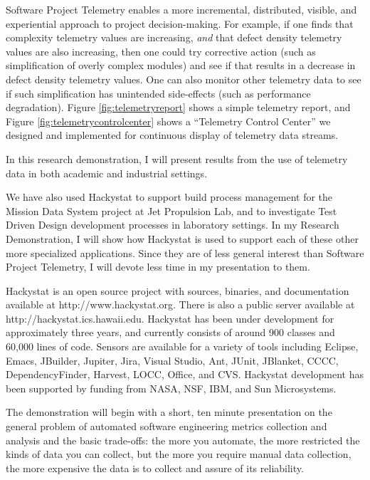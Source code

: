 \documentclass[11pt,twocolumn]{article}
\begin{document}
Software Project Telemetry enables a more incremental, distributed,
visible, and experiential approach to project decision-making. For example,
if one finds that complexity telemetry values are increasing, {\em and}
that defect density telemetry values are also increasing, then one could
try corrective action (such as simplification of overly complex modules)
and see if that results in a decrease in defect density telemetry
values. One can also monitor other telemetry data to see if such
simplification has unintended side-effects (such as performance
degradation).  Figure \ref{fig:telemetryreport} shows a simple telemetry 
report, and Figure \ref{fig:telemetrycontrolcenter} shows a ``Telemetry Control Center'' 
we designed and implemented for continuous display of telemetry data streams. 

In this research demonstration, I will present results from the use of 
telemetry data in both academic and industrial settings. 



We have also used Hackystat to support build process management for the
Mission Data System project at Jet Propulsion Lab, and to investigate Test
Driven Design development processes in laboratory settings. In my Research
Demonstration, I will show how Hackystat is used to support each of these
other more specialized applications. Since they are of less general
interest than Software Project Telemetry, I will devote less time in my
presentation to them.


Hackystat is an open source project with sources, binaries, and
documentation available at http://www.hackystat.org.  There is also a
public server available at http://hackystat.ics.hawaii.edu.  Hackystat has
been under development for approximately three years, and currently
consists of around 900 classes and 60,000 lines of code.  Sensors are
available for a variety of tools including Eclipse, Emacs, JBuilder, Jupiter, Jira, Visual
Studio, Ant, JUnit, JBlanket, CCCC, DependencyFinder, Harvest, LOCC,
Office, and CVS.  Hackystat development has been supported by funding from 
NASA, NSF, IBM, and Sun Microsystems.


The demonstration will begin with a short, ten minute presentation on the 
general problem of automated software engineering metrics collection and analysis 
and the basic trade-offs: the more you automate, the more restricted the kinds of
data you can collect, but the more you require manual data collection, the more
expensive the data is to collect and assure of its reliability.  
\end{document}

